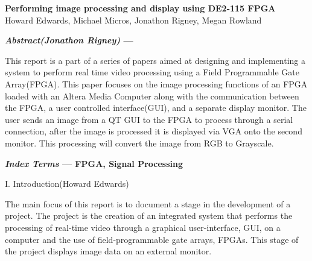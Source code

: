 \documentclass{article}
\begin{document}
\begin{center}

\vspace* {15 pt}
\Huge{\bf Performing image processing and display using DE2-115 FPGA}\\
\vspace {20 pt}
\large{Howard Edwards, Michael Micros, Jonathon  Rigney, Megan Rowland \\}

\end{center}

\vspace{15 pt}




\begin{multicols*}{2}

{\bf  \textit {Abstract(Jonathon Rigney)} ---}
\par 
This report is a part of a series of papers aimed at designing and implementing a system to perform real time video processing using a Field Programmable Gate Array(FPGA). This paper focuses on the image processing functions of an FPGA loaded with an Altera Media Computer along with the communication between the FPGA, a user controlled interface(GUI), and a separate display monitor. The user sends an image from a QT GUI to the FPGA to process through a serial connection, after the image is processed it is displayed via VGA onto the second monitor. This processing will convert the image from RGB to Grayscale. 



{\bf  \textit {Index Terms} --- FPGA, Signal Processing}




\begin{center}
\large{I. Introduction(Howard Edwards)}
\end{center}
\par   The main focus of this report is to document a stage in the development of a project. The project is the creation of an integrated system that performs the processing of real-time video through a graphical user-interface, GUI, on a computer and the use of field-programmable gate arrays, FPGAs. This stage of the project displays image data on an external monitor.


\end{multicols*}
\end{document}
